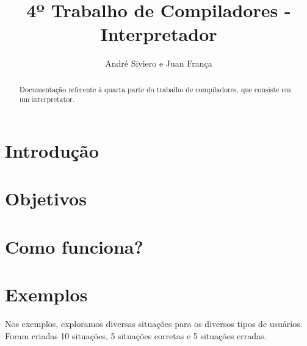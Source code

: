 \documentclass[a4paper,10pt]{article}
\title{4º Trabalho de Compiladores - Interpretador}
\author{André Siviero e Juan França}
\begin{document}
\maketitle

\begin{abstract}
Documentação referente à quarta parte do trabalho de compiladores, que consiste em um interpretator.
\end{abstract}

\section{Introdução}
\section{Objetivos}
\section{Como funciona?}
\section{Exemplos}
Nos exemplos, exploramos diversas situações para os diversos tipos de usuários. Foram criadas 10 situações, 5 situações corretas e 5 
situações erradas.
\end{document}
